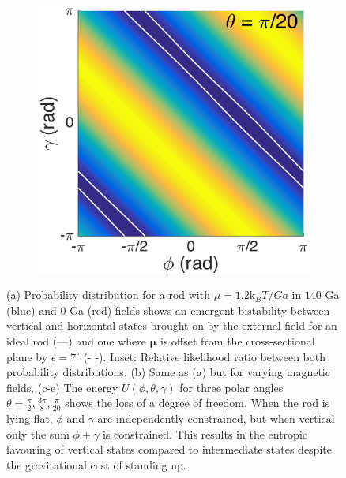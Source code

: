 \documentclass[aps,prl,superscriptaddress]{revtex4-1}
\newcommand{\vcrm}[1]{\mathbf{#1}}
\newcommand{\hvcrm}[1]{\mathbf{\hat{#1}}}
\newcommand{\vc}[1]{\boldsymbol{#1}}
\newcommand{\hvc}[1]{\boldsymbol{\hat{#1}}}
\newcommand{\kk}{\mathrm{k}_B}
\begin{document}
\begin{figure}
\begin{subfigure}[t]{0.32\columnwidth}
    	\caption{\label{phaseb}}
    \end{subfigure}
    \begin{subfigure}[t]{0.32\columnwidth}
    	\includegraphics[width=\textwidth]{figs/Figure5c.eps}
    	\caption{\label{phasec}}
    \end{subfigure}
    \caption{\footnotesize (a) Probability distribution for a rod with $\mu=1.2 \kk T/Ga$ in $140$ Ga (blue) and $0$ Ga (red) fields shows an emergent bistability between vertical and horizontal states brought on by the external field for an ideal rod (---) and one where $\vc{\mu}$ is offset from the cross-sectional plane by $\epsilon=7^\circ$ (- -). Inset: Relative likelihood ratio between both probability distributions. (b) Same as (a) but for varying magnetic fields. (c-e) The energy $U(\phi,\theta,\gamma)$ for three polar angles $\theta=\frac{\pi}{2},\frac{3\pi}{8},\frac{\pi}{20}$ shows the loss of a degree of freedom. When the rod is lying flat, $\phi$ and $\gamma$ are independently constrained, but when vertical only the sum $\phi+\gamma$ is constrained. This results in the entropic favouring of vertical states compared to intermediate states despite the gravitational cost of standing up. \label{theory}}
\end{figure}


\end{document}
